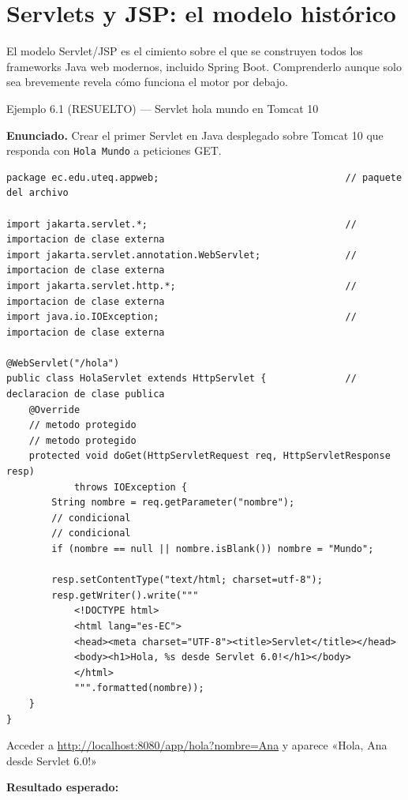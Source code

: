 \documentclass[11pt,a4paper,openany]{book}
\begin{document}
\section{Servlets y JSP: el modelo histórico}

El modelo Servlet/JSP es el cimiento sobre el que se
construyen todos los frameworks Java web modernos, incluido Spring
Boot. Comprenderlo aunque solo sea brevemente revela cómo funciona
el motor por debajo.


\begin{cajaejemplo}{Ejemplo 6.1 (RESUELTO) --- Servlet hola mundo en Tomcat 10}


\textbf{Enunciado.} Crear el primer Servlet en Java desplegado sobre Tomcat 10 que responda con \texttt{Hola Mundo} a peticiones GET.

\begin{lstlisting}[style=java,caption={HolaServlet.java},label=lst:6.1]
package ec.edu.uteq.appweb;                                 // paquete del archivo

import jakarta.servlet.*;                                   // importacion de clase externa
import jakarta.servlet.annotation.WebServlet;               // importacion de clase externa
import jakarta.servlet.http.*;                              // importacion de clase externa
import java.io.IOException;                                 // importacion de clase externa

@WebServlet("/hola")
public class HolaServlet extends HttpServlet {              // declaracion de clase publica
    @Override
    // metodo protegido
    // metodo protegido
    protected void doGet(HttpServletRequest req, HttpServletResponse resp)
            throws IOException {
        String nombre = req.getParameter("nombre");
        // condicional
        // condicional
        if (nombre == null || nombre.isBlank()) nombre = "Mundo";

        resp.setContentType("text/html; charset=utf-8");
        resp.getWriter().write("""
            <!DOCTYPE html>
            <html lang="es-EC">
            <head><meta charset="UTF-8"><title>Servlet</title></head>
            <body><h1>Hola, %s desde Servlet 6.0!</h1></body>
            </html>
            """.formatted(nombre));
    }
}
\end{lstlisting}

Acceder a \url{http://localhost:8080/app/hola?nombre=Ana} y aparece
«Hola, Ana desde Servlet 6.0!»

\textbf{Resultado esperado:}

\end{cajaejemplo}
\end{document}
